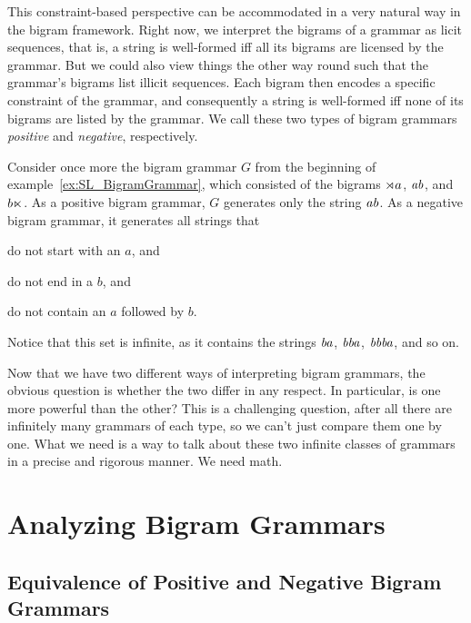This constraint-based perspective can be accommodated in a very natural way in the bigram framework.
Right now, we interpret the bigrams of a grammar as licit sequences, that is, a string is well-formed iff all its bigrams are licensed by the grammar. 
But we could also view things the other way round such that the grammar's bigrams list illicit sequences.
Each bigram then encodes a specific constraint of the grammar, and consequently a string is well-formed iff none of its bigrams are listed by the grammar.
We call these two types of bigram grammars \emph{positive} and \emph{negative}, respectively.
%
\begin{examplebox}
    Consider once more the bigram grammar $G$ from the beginning of example~\ref{ex:SL_BigramGrammar}, which consisted of the bigrams $\rtimes a$, $\mathit{ab}$, and $b \ltimes$.
    As a positive bigram grammar, $G$ generates only the string $\mathit{ab}$.
    As a negative bigram grammar, it generates all strings that
    \begin{itemize*}
        \item do not start with an $a$, and
        \item do not end in a $b$, and
        \item do not contain an $a$ followed by $b$.
    \end{itemize*}
    Notice that this set is infinite, as it contains the strings $\mathit{ba}$, $\mathit{bba}$, $\mathit{bbba}$, and so on.
\end{examplebox}

Now that we have two different ways of interpreting bigram grammars, the obvious question is whether the two differ in any respect.
In particular, is one more powerful than the other?
This is a challenging question, after all there are infinitely many grammars of each type, so we can't just compare them one by one.
What we need is a way to talk about these two infinite classes of grammars in a precise and rigorous manner.
We need math.


\section{Analyzing Bigram Grammars}

\subsection{Equivalence of Positive and Negative Bigram Grammars}

